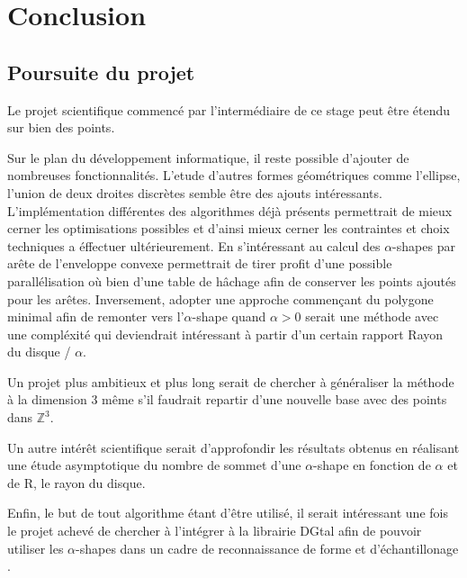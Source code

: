 \section{Conclusion}

\subsection{Poursuite du projet}

Le projet scientifique commencé par l'intermédiaire de ce stage peut être étendu sur bien des points. 

Sur le plan du développement informatique, il reste possible d'ajouter de nombreuses fonctionnalités. L'etude d'autres formes géométriques comme l'ellipse, l'union de deux droites discrètes semble être des ajouts intéressants. L'implémentation différentes des algorithmes déjà présents permettrait de mieux cerner les optimisations possibles et d'ainsi mieux cerner les contraintes et choix techniques a éffectuer ultérieurement. En s'intéressant au calcul des $\alpha$-shapes par arête de l'enveloppe convexe permettrait de tirer profit d'une possible parallélisation où bien d'une table de hâchage afin de conserver les points ajoutés pour les arêtes. Inversement, adopter une approche commençant du polygone minimal afin de remonter vers l'$\alpha$-shape quand $\alpha > 0$ serait une méthode avec une compléxité qui deviendrait intéressant à partir d'un certain rapport Rayon du disque / $\alpha$.

Un projet plus ambitieux et plus long serait de chercher à généraliser la méthode à la dimension 3 même s'il faudrait repartir d'une nouvelle base avec des points dans $\mathbb{Z}^{3}$. 

Un autre intérêt scientifique serait d'approfondir les résultats obtenus en réalisant une étude asymptotique du nombre de sommet d'une $\alpha$-shape en fonction de $\alpha$ et de R, le rayon du disque.

Enfin, le but de tout algorithme étant d'être utilisé, il serait intéressant une fois le projet achevé de chercher à l'intégrer à la librairie DGtal afin de pouvoir utiliser les $\alpha$-shapes dans un cadre de reconnaissance de forme et d'échantillonage \cite{BernardiniB97}.


